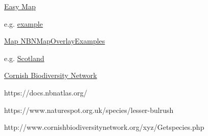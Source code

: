 \documentclass[a4paper,12pt,landscape]{article}
\begin{document}
\href{https://easymap.nbnatlas.org/}{Easy Map}

e.g. \href{https://easymap.nbnatlas.org/Image?tvk=NHMSYS0000458716&w=800}{example}

\href{https://github.com/DuncanRowland/NBNMapOverlayExamples}{Map NBNMapOverlayExamples}

e.g. \href{https://duncanrowland.github.io/NBNMapOverlayExamples/leaflet1.html}{Scotland}

\href{http://www.cornishbiodiversitynetwork.org/xyz/Get1km.php}{Cornish Biodiversity Network}


https://docs.nbnatlas.org/


https://www.naturespot.org.uk/species/lesser-bulrush

http://www.cornishbiodiversitynetwork.org/xyz/Getspecies.php
\end{document}
